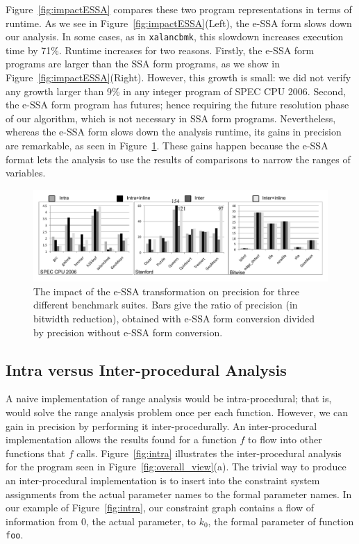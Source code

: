 \documentclass{llncs}
\begin{document}
Figure~\ref{fig:impactESSA} compares these two program representations in
terms of runtime.
As we see in Figure~\ref{fig:impactESSA}(Left), the e-SSA form slows down our
analysis.
In some cases, as in \texttt{xalancbmk}, this slowdown increases execution
time by 71\%.
Runtime increases for two reasons.
Firstly, the e-SSA form programs are larger than the SSA form programs, as we
show in Figure~\ref{fig:impactESSA}(Right).
However, this growth is small: we did not verify any growth larger than 9\% in
any integer program of SPEC CPU 2006.
Second, the e-SSA form program has futures; hence requiring the future resolution
phase of our algorithm, which is not necessary in SSA form programs.
Nevertheless, whereas the e-SSA form slows down the analysis runtime, its gains in
precision are remarkable, as seen in Figure~\ref{fig:precESSA}.
These gains happen because the e-SSA format lets the analysis to use the
results of comparisons to narrow the ranges of variables.

\begin{figure}[t!]
\begin{center}
\includegraphics[width=1\textwidth]{images/precESSA}
\end{center}
\caption{\label{fig:precESSA}
The impact of the e-SSA transformation on precision for three different
benchmark suites. Bars give the ratio of precision (in bitwidth reduction),
obtained with e-SSA form conversion divided by precision without e-SSA form
conversion.}
\end{figure}

\subsection{Intra versus Inter-procedural Analysis}
\label{sub:whole}

A naive implementation of range analysis would be intra-procedural; that is,
would solve the range analysis problem once per each function.
However, we can gain in precision by performing it inter-procedurally.
An inter-procedural implementation allows the results found for a function $f$
to flow into other functions that $f$ calls.
Figure~\ref{fig:intra} illustrates the inter-procedural analysis for the
program seen in Figure~\ref{fig:overall_view}(a).
The trivial way to produce an inter-procedural implementation is to insert
into the constraint system assignments from the actual parameter names to the
formal parameter names.
In our example of Figure~\ref{fig:intra}, our constraint graph contains a flow
of information from $0$, the actual parameter, to $k_0$, the formal parameter
of function \texttt{foo}.
\end{document}
